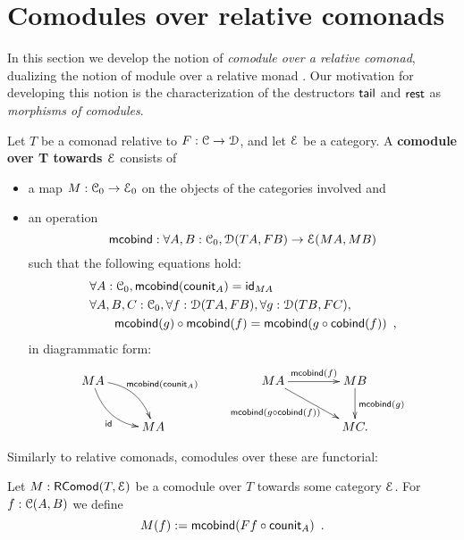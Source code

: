 \documentclass[a4paper,USenglish]{lipics}
\newcommand{\fat}[1]{\textbf{#1}}
\newcommand{\itemizedist}{.5em}
\begin{document}
\section{Comodules over relative comonads}\label{sec:comodules}

In this section we develop the notion of \emph{comodule over a relative comonad}, dualizing the notion of module over a relative monad \parencite{ahrens_relmonads}.
Our motivation for developing this notion is the characterization of the destructors $\stail$ and $\tail$ as \emph{morphisms of comodules}.

\begin{defn}%
\label{def:comodule}
 Let $T$ be a comonad relative to $F:\C\to\D$, and let $\E$ be a category.
 A \fat{comodule over T towards $\E$} consists of
   \begin{itemize}\setlength{\itemsep}{\itemizedist}
   \item a map $M:\C_0 \to \E_0$ on the objects of the categories involved and
   \item an operation \[\mcobind: \forall A,B:\C_0, \D(TA,FB) \to \E(MA,MB)\] such that the following equations hold:
 \begin{align}
 &  \forall A : \C_0, \mcobind(\counit_A) = \id_{MA} \\
 & \forall A,B,C:\C_0, \forall f : \D(TA,FB),\forall g:\D(TB,FC), \notag\\
 &   \qquad      \comp{\mcobind(f)}{\mcobind(g)} = \mcobind(\comp{\cobind(f)}{g}) \enspace ,
 \end{align}
  in diagrammatic form:
\[
    \begin{xy}
    \xymatrix{
                       MA \ar@/^1pc/[rd]^{\mcobind(\counit_A)} \ar@/_1pc/[rd]_{\id}& \\
                          & MA
    }
   \end{xy}
   \qquad
   \begin{xy}
    \xymatrix@C=4em{
       MA \ar[r]^{\mcobind(f)} \ar[rd]_{\mcobind(\comp{\cobind(f)}{g})\;\;\;\;\;}& MB \ar[d]^{\mcobind(g)} \\
          & MC .
    }
   \end{xy}
\]  
  
  
  \end{itemize}

\end{defn}


\begin{Long}
Similarly to relative comonads, comodules over these are functorial:
\begin{defn}
\label{def:comodule_lift}
 Let $M : \RComod(T,\E)$ be a comodule over $T$ towards some category $\E$. For $f : \C(A,B)$ we define
  \[ M(f) := \mcobind(\comp{\counit_A}{Ff}) \enspace .  \]
\end{defn}
\end{Long}
\end{document}
